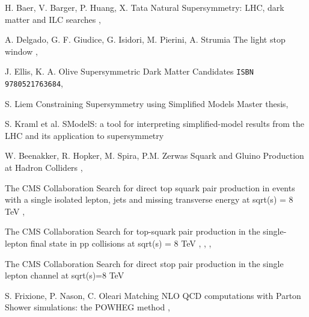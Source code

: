 {H. Baer, V. Barger, P. Huang, X. Tata}
{Natural Supersymmetry: LHC, dark matter and ILC searches}
{, }

{A. Delgado, G. F. Giudice, G. Isidori, M. Pierini, A. Strumia}
{The light stop window}
{, }

{J. Ellis, K. A. Olive}
{Supersymmetric Dark Matter Candidates}
{\texttt{ISBN 9780521763684}, }

{S. Liem}
{Constraining Supersymmetry using Simplified Models}
{Master thesis, }

{S. Kraml et al.}
{SModelS: a tool for interpreting simplified-model results from the LHC and its application to supersymmetry}
{ }

{W. Beenakker, R. Hopker, M. Spira, P.M. Zerwas}
{Squark and Gluino Production at Hadron Colliders}
{, }


{The CMS Collaboration}
{Search for direct top squark pair production in events with a single isolated lepton, jets and missing transverse energy at sqrt(s) = 8 TeV}
{, }

{The CMS Collaboration}
{Search for top-squark pair production in the single-lepton final state in pp collisions at sqrt(s) = 8 TeV}
{, , , }

{The CMS Collaboration}
{Search for direct stop pair production in the single lepton channel at sqrt(s)=8 TeV}
{}


{S. Frixione, P. Nason, C. Oleari}
{Matching NLO QCD computations with Parton Shower simulations: the POWHEG method}
{, }


